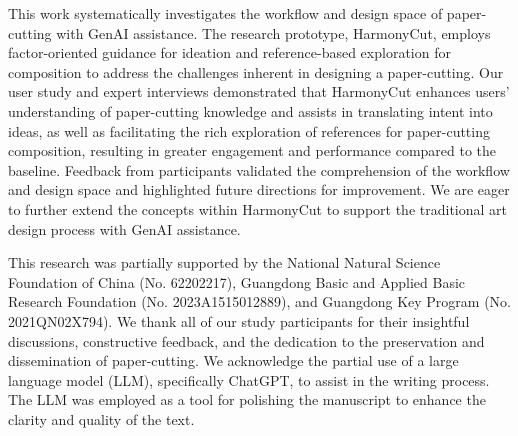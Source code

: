
This work systematically investigates the workflow and design space of paper-cutting with GenAI assistance. The research prototype, HarmonyCut, employs factor-oriented guidance for ideation and reference-based exploration for composition to address the challenges inherent in designing a paper-cutting. Our user study and expert interviews demonstrated that HarmonyCut enhances users' understanding of paper-cutting knowledge and assists in translating intent into ideas, as well as facilitating the rich exploration of references for paper-cutting composition, resulting in greater engagement and performance compared to the baseline. Feedback from participants validated the comprehension of the workflow and design space and highlighted future directions for improvement. We are eager to further extend the concepts within HarmonyCut to support the traditional art design process with GenAI assistance.

\begin{acks}
This research was partially supported by the National Natural Science Foundation of China (No. 62202217), Guangdong Basic and Applied Basic Research Foundation (No. 2023A1515012889), and Guangdong Key Program (No. 2021QN02X794). We thank all of our study participants for their insightful discussions, constructive feedback, and the dedication to the preservation and dissemination of paper-cutting.
We acknowledge the partial use of a large language model (LLM), specifically ChatGPT, to assist in the writing process. The LLM was employed as a tool for polishing the manuscript to enhance the clarity and quality of the text.
\end{acks}
